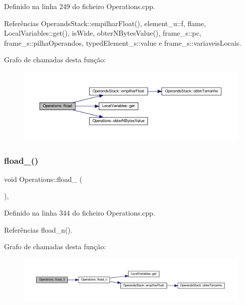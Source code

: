 Definido na linha 249 do ficheiro Operations.\+cpp.



Referências Operands\+Stack\+::empilhar\+Float(), element\+\_\+u\+::f, flame, Local\+Variables\+::get(), is\+Wide, obter\+N\+Bytes\+Value(), frame\+\_\+s\+::pc, frame\+\_\+s\+::pilha\+Operandos, typed\+Element\+\_\+s\+::value e frame\+\_\+s\+::variaveis\+Locais.

Grafo de chamadas desta função\+:
\nopagebreak
\begin{figure}[H]
\begin{center}
\leavevmode
\includegraphics[width=350pt]{classOperations_af6204248b38b7e6af3a4a6d0f805d79f_cgraph}
\end{center}
\end{figure}
\mbox{\label{classOperations_a844c8a8d812c4f78c8f1024bbdac0548}} 
\subsubsection{\texorpdfstring{fload\+\_()}{fload\_0()}}
{\footnotesize\ttfamily void Operations\+::fload\+\_ (\begin{DoxyParamCaption}{ }\end{DoxyParamCaption})\hspace{0.3cm}{\ttfamily [static]}, {\ttfamily [private]}}



Definido na linha 344 do ficheiro Operations.\+cpp.



Referências fload\+\_\+n().

Grafo de chamadas desta função\+:
\nopagebreak
\begin{figure}[H]
\begin{center}
\leavevmode
\includegraphics[width=350pt]{classOperations_a844c8a8d812c4f78c8f1024bbdac0548_cgraph}
\end{center}
\end{figure}
\mbox{\label{classOperations_a71611bd9fa43e8e170a35f3a5e1f0572}} 
